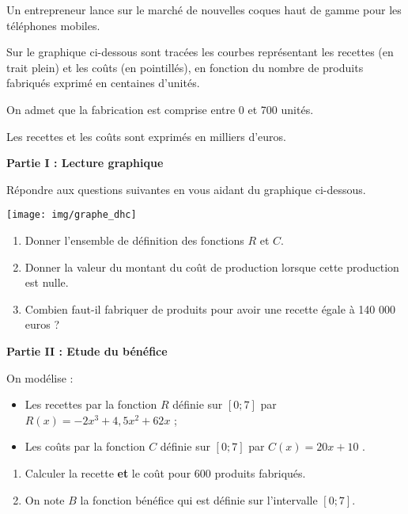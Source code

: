 \documentclass[a4paper]{article}
\begin{document}
    \medskip

    \begin{exercice}{}{}
      Un entrepreneur lance sur le marché de nouvelles coques haut de gamme pour les téléphones mobiles.
      
      Sur le graphique ci-dessous sont tracées les courbes représentant les recettes (en trait plein) et les coûts (en pointillés), en fonction du nombre de produits fabriqués exprimé en centaines d'unités.
      
      On admet que la fabrication est comprise entre 0 et 700 unités.
      
      Les recettes et les coûts sont exprimés en milliers d'euros.
      \vspace{3mm}
      
      {\bf Partie I : Lecture graphique}


      Répondre aux questions suivantes en vous aidant du graphique ci-dessous.
      
      \centerline{\texttt{[image: img/graphe\_dhc]}}

      \begin{enumerate}
        \item Donner l'ensemble de définition des fonctions $R$ et $C$.
        \item Donner la valeur du montant du coût de production lorsque cette production est nulle. 
        \item Combien faut-il fabriquer de produits pour avoir une recette égale à 140 000 euros ?
      \end{enumerate}
      
      {\bf Partie II : Etude du bénéfice}


      On modélise :
      \begin{itemize}
        \item Les recettes par la fonction $R$ définie sur $[0 ; 7]$ par $R(x) = -2x^3 + 4,5x^2 + 62x$ ;
        \item Les coûts par la fonction $C$ définie sur $[0 ; 7]$ par $C(x) = 20x + 10$ .
      \end{itemize}
      
      \begin{enumerate}
        \item Calculer la recette {\bf et} le coût pour 600 produits fabriqués.
        \item On note $B$ la fonction bénéfice qui est définie sur l'intervalle $[0 ; 7]$.
        

\end{enumerate}
\end{exercice}
\end{document}
